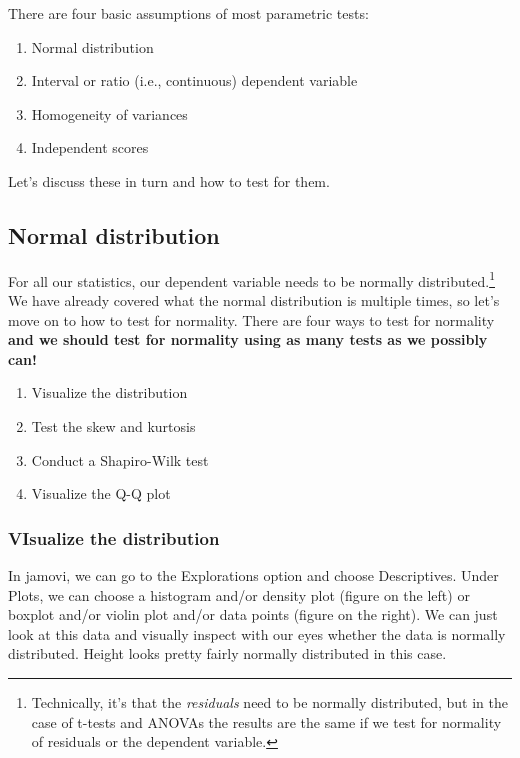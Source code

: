 \documentclass[
]{book}
\providecommand{\tightlist}{%
  \setlength{\itemsep}{0pt}\setlength{\parskip}{0pt}}
\begin{document}
There are four basic assumptions of most parametric tests:

\begin{enumerate}
\def\labelenumi{\arabic{enumi}.}
\tightlist
\item
  Normal distribution
\item
  Interval or ratio (i.e., continuous) dependent variable
\item
  Homogeneity of variances
\item
  Independent scores
\end{enumerate}

Let's discuss these in turn and how to test for them.

\hypertarget{normal-distribution-1}{%
\subsection{Normal distribution}\label{normal-distribution-1}}

For all our statistics, our dependent variable needs to be normally distributed.\footnote{Technically, it's that the \emph{residuals} need to be normally distributed, but in the case of t-tests and ANOVAs the results are the same if we test for normality of residuals or the dependent variable.} We have already covered what the normal distribution is multiple times, so let's move on to how to test for normality. There are four ways to test for normality \textbf{and we should test for normality using as many tests as we possibly can!}

\begin{enumerate}
\def\labelenumi{\arabic{enumi}.}
\tightlist
\item
  Visualize the distribution
\item
  Test the skew and kurtosis
\item
  Conduct a Shapiro-Wilk test
\item
  Visualize the Q-Q plot
\end{enumerate}

\hypertarget{visualize-the-distribution}{%
\subsubsection{VIsualize the distribution}\label{visualize-the-distribution}}

In jamovi, we can go to the Explorations option and choose Descriptives. Under Plots, we can choose a histogram and/or density plot (figure on the left) or boxplot and/or violin plot and/or data points (figure on the right). We can just look at this data and visually inspect with our eyes whether the data is normally distributed. Height looks pretty fairly normally distributed in this case.
\end{document}
